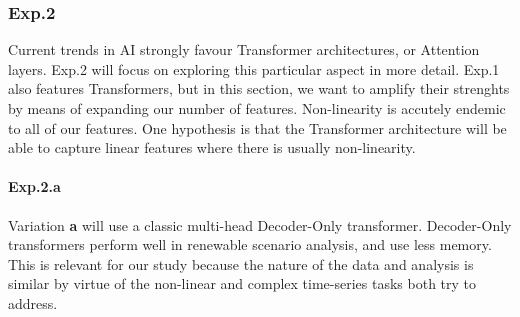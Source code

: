 \begin{table}[ht]
\centering
{}
\caption{Exp.2: Model Architectures and Preprocessing}\label{tab:exp2}
\end{table}

\subsubsection{Exp.2}

Current trends in AI strongly favour Transformer architectures, or Attention layers. Exp.2 will focus on exploring this particular aspect in more detail. Exp.1 also features Transformers, but in this section, we want to 
amplify their strenghts by means of expanding our number of features. Non-linearity is accutely endemic to all of our features\cite{Manero2018}. One hypothesis is that the Transformer architecture will be able to
capture linear features where there is usually non-linearity.

\paragraph{Exp.2.a}
Variation \textbf{a} will use a classic multi-head Decoder-Only transformer\cite{Oliveira2023}. Decoder-Only transformers perform well in renewable scenario analysis, and use less memory\cite{Hussan2026-dy}. This 
is relevant for our study because the nature of the data and analysis is similar by virtue of the non-linear and complex time-series tasks both try to address.


